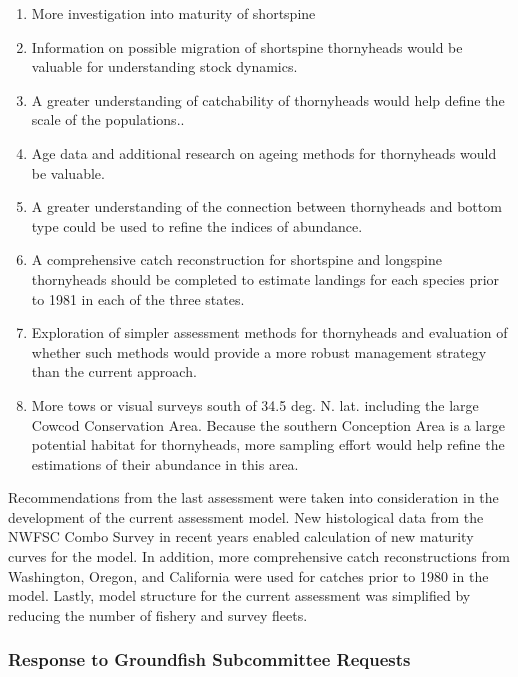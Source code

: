\documentclass[11pt,
  english,
  letterpaper,
]{article}
\providecommand{\tightlist}{%
  \setlength{\itemsep}{0pt}\setlength{\parskip}{0pt}}
\providecommand{\tightlist}{%
  \setlength{\itemsep}{0pt}\setlength{\parskip}{0pt}}
\begin{document}
\begin{enumerate}
\def\labelenumi{\arabic{enumi}.}
\tightlist
\item
  More investigation into maturity of shortspine
\item
  Information on possible migration of shortspine thornyheads would be valuable for understanding stock dynamics.
\item
  A greater understanding of catchability of thornyheads would help define the scale of the populations..
\item
  Age data and additional research on ageing methods for thornyheads would be valuable.
\item
  A greater understanding of the connection between thornyheads and bottom type could be used to refine the indices of abundance.
\item
  A comprehensive catch reconstruction for shortspine and longspine thornyheads should be completed to estimate landings for each species prior to 1981 in each of the three states.
\item
  Exploration of simpler assessment methods for thornyheads and evaluation of whether such methods would provide a more robust management strategy than the current approach.
\item
  More tows or visual surveys south of 34.5 deg. N. lat. including the large Cowcod Conservation Area. Because the southern Conception Area is a large potential habitat for thornyheads, more sampling effort would help refine the estimations of their abundance in this area.
\end{enumerate}

Recommendations from the last assessment were taken into consideration in the development of the current assessment model. New histological data from the NWFSC Combo Survey in recent years enabled calculation of new maturity curves for the model. In addition, more comprehensive catch reconstructions from Washington, Oregon, and California were used for catches prior to 1980 in the model. Lastly, model structure for the current assessment was simplified by reducing the number of fishery and survey fleets.

\hypertarget{response-to-groundfish-subcommittee-requests}{%
\subsubsection{Response to Groundfish Subcommittee Requests}\label{response-to-groundfish-subcommittee-requests}}
\end{document}
